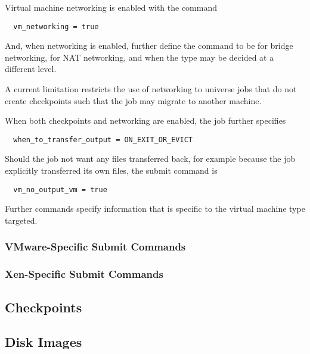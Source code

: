 Virtual machine networking is enabled with the command
\begin{verbatim}
  vm_networking = true
\end{verbatim}
And, when networking is enabled, further define the command
 to be 
 for bridge networking,
 for NAT networking,
and  when the type may be decided at a different level.

A current limitation restricts the use of networking to
 universe jobs that do not create checkpoints
such that the job may migrate to another machine.

When both checkpoints and networking are enabled,
the job further specifies
\begin{verbatim}
  when_to_transfer_output = ON_EXIT_OR_EVICT
\end{verbatim}
Should the job not want any files transferred back,
for example because the job explicitly transferred its own files,
the submit command is
\begin{verbatim}
  vm_no_output_vm = true
\end{verbatim}

Further commands specify information that is specific to the
virtual machine type targeted.
\subsubsection{\label{sec:vm-VMwaresubmitfile}VMware-Specific Submit Commands}
\Todo
\subsubsection{\label{sec:vm-Xensubmitfile}Xen-Specific Submit Commands}
\Todo

\subsection{\label{sec:vm-checkpoints}Checkpoints}
\Todo

\subsection{\label{sec:vm-disk-image-details}Disk Images}
\Todo


